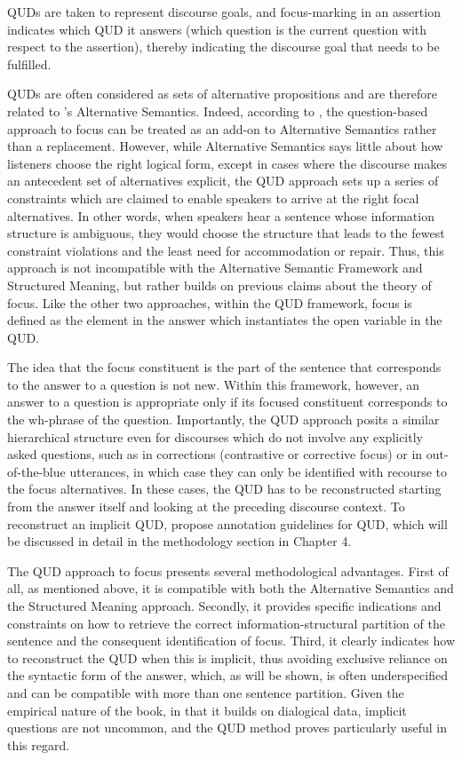 QUDs are taken to represent discourse goals, and focus-marking in an assertion indicates which QUD it answers (which question is the current question with respect to the assertion), thereby indicating the discourse goal that needs to be fulfilled.

QUDs are often considered as sets of alternative propositions and are therefore related to \textcite{rooth1985association, rooth1992theory}'s Alternative Semantics. Indeed, according to \textcite{velleman2016question}, the question-based approach to focus can be treated as an add-on to Alternative Semantics rather than a replacement.
However, while Alternative Semantics says little about how listeners choose the right logical form, except in cases where the discourse makes an antecedent set of alternatives explicit, the QUD approach sets up a series of constraints which are claimed to enable speakers to arrive at the right focal alternatives. In other words, when speakers hear a sentence whose information structure is ambiguous, they would choose the structure that leads to the fewest constraint violations and the least need for accommodation or repair.
Thus, this approach is not incompatible with the Alternative Semantic Framework and Structured Meaning, but rather builds on previous claims about the theory of focus. Like the other two approaches, within the QUD framework, focus is defined as the element in the answer which instantiates the open variable in the QUD. 

The idea that the focus constituent is the part of the sentence that corresponds to the answer to a question \parencite{bresnan1989locative} is not new. Within this framework, however, an answer to a question is appropriate only if its focused constituent corresponds to the wh-phrase of the question. 
Importantly, the QUD approach posits a similar hierarchical structure even for discourses which do not involve any explicitly asked questions, such as in corrections (contrastive or corrective focus) or in out-of-the-blue utterances, in which case they can only be identified with recourse to the focus alternatives.
 In these cases, the QUD has to be reconstructed starting from the answer itself and looking at the preceding discourse context. To reconstruct an implicit QUD, \textcite{riester2018annotation, riester2019constructing} propose annotation guidelines for QUD, which will be discussed in detail in the methodology section in Chapter 4. 
 
The QUD approach to focus presents several methodological advantages. First of all, as mentioned above, it is compatible with both the Alternative Semantics and the Structured Meaning approach. Secondly, it provides specific indications and constraints on how to retrieve the correct information-structural partition of the sentence and the consequent identification of focus. Third, it clearly indicates how to reconstruct the QUD when this is implicit, thus avoiding exclusive reliance on the syntactic form of the answer, which, as will be shown, is often underspecified and can be compatible with more than one sentence partition. Given the empirical nature of the book, in that it builds on dialogical data, implicit questions are not uncommon, and the QUD method proves particularly useful in this regard.
 
